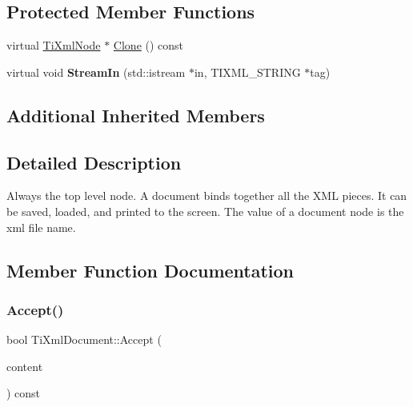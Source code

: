 \subsection*{Protected Member Functions}
\begin{DoxyCompactItemize}
\item 
virtual \hyperlink{class_ti_xml_node}{Ti\+Xml\+Node} $\ast$ \hyperlink{class_ti_xml_document_a46a4dda6c56eb106d46d4046ae1e5353}{Clone} () const
\item 
\hypertarget{class_ti_xml_document_aceaada9ac29206fb660e0449c92b1295}{}\label{class_ti_xml_document_aceaada9ac29206fb660e0449c92b1295} 
virtual void {\bfseries Stream\+In} (std\+::istream $\ast$in, T\+I\+X\+M\+L\+\_\+\+S\+T\+R\+I\+NG $\ast$tag)
\end{DoxyCompactItemize}
\subsection*{Additional Inherited Members}


\subsection{Detailed Description}
Always the top level node. A document binds together all the X\+ML pieces. It can be saved, loaded, and printed to the screen. The \textquotesingle{}value\textquotesingle{} of a document node is the xml file name. 

\subsection{Member Function Documentation}
\hypertarget{class_ti_xml_document_a8ddd6eec722cbd25900bbac664909bac}{}\label{class_ti_xml_document_a8ddd6eec722cbd25900bbac664909bac} 
\subsubsection{\texorpdfstring{Accept()}{Accept()}}
{\footnotesize\ttfamily bool Ti\+Xml\+Document\+::\+Accept (\begin{DoxyParamCaption}\item[{\hyperlink{class_ti_xml_visitor}{Ti\+Xml\+Visitor} $\ast$}]{content }\end{DoxyParamCaption}) const\hspace{0.3cm}{\ttfamily [virtual]}}

